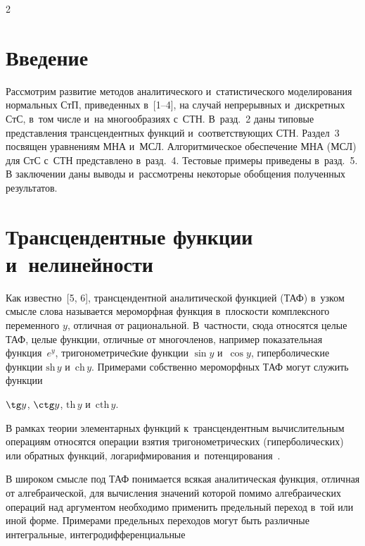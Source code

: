 \begin{multicols}{2}



\label{st\stat}



\section{Введение}



Рассмотрим развитие методов аналитического и~статистического моделирования нормальных СтП, приведенных в~[1--4], на случай непрерывных и~дискретных СтС, в~том числе и~на многообразиях с~СТН. В~разд.~2 даны типовые представления трансцендентных функций и~соответствующих  СТН. Раздел~3 посвящен уравнениям МНА и~МСЛ. Алгоритмическое обеспечение МНА (МСЛ) для СтС с~СТН представлено в~разд.~4. Тестовые примеры приведены в~разд.~5. В заключении даны выводы и~рассмотрены некоторые обобщения полученных результатов.



\vspace*{-6pt}



\section{Трансцендентные функции и~нелинейности}



Как известно~[5, 6], трансцендентной аналитической функцией (ТАФ) в~узком смысле слова называется мероморфная функция в~плоскости комплексного переменного $y$, отличная от рациональной. В~частности, сюда относятся целые ТАФ, целые функции, отличные от многочленов, например показательная функция~$e^y$, три\-го\-но\-мет\-ри\-че\=ские функции $\sin y$ и~$\cos y$, гиперболические функции  $\mathrm{sh}\, y$ и~$\mathrm{ch}\, y$. Примерами собственно мероморфных ТАФ могут служить функции

$\tg y$, $\ctg y$, $\mathrm{th}\, y$ и~$\mathrm{cth}\, y$.



В рамках теории элементарных функций к~трансцендентным вычислительным операциям относятся операции взятия тригонометрических (гиперболических) или обратных функций, логарифмирования и~потенцирования~\cite{5-s}.



В широком смысле под ТАФ понимается всякая аналитическая функция, отличная от алгебраической, для вычисления значений которой помимо алгебраических операций над аргументом необходимо применить предельный переход в~той или иной форме. Примерами предельных переходов могут быть различные интегральные, интегродифференциальные


\end{multicols}
